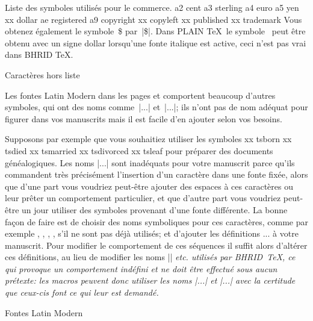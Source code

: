 \smallskip
Liste des symboles utilisés pour le commerce.
\beginchartable
a2 cent
a3 sterling
a4 euro
a5 yen
xx dollar
ae registered
a9 copyright
xx copyleft
xx published
xx trademark
\endchartable
Vous obtenez également le symbole~\$ par~|\$|. Dans PLAIN \TeX\ le
symbole \sterling\ peut être obtenu avec un signe dollar lorsqu'une
fonte italique est active, ceci n'est pas vrai dans BHRID \TeX.


\formalpar Caractères hors liste

Les fontes Latin Modern dans les pages  et  comportent
beaucoup d'autres symboles, qui ont des noms comme~|\tl...|
et~|\ts...|; ils n'ont pas de nom adéquat pour figurer dans vos
manuscrits mais il est facile d'en ajouter selon vos besoins.

Supposons par exemple que vous souhaitiez utiliser les symboles
\beginchartable
xx tsborn
xx tsdied
xx tsmarried
xx tsdivorced
xx tsleaf
\endchartable
pour préparer des documents généalogiques. Les noms |\ts...| sont
inadéquats pour votre manuscrit parce qu'ils commandent très
précisément l'insertion d'un caractère dans une fonte fixée, alors que
d'une part vous voudriez peut-être ajouter des espaces à ces
caractères ou leur prêter un comportement particulier, et que d'autre
part vous voudriez peut-être un jour utiliser des symboles provenant
d'une fonte différente. La bonne façon de faire est de choisir des
noms symboliques pour ces caractères, comme par exemple ,
, , ,  s'il ne sont pas
déjà utilisés; et d'ajouter les définitions
\begincode
\def\born{\tsborn}
\def\died{\tsdied}
...
\endcode
à votre manuscrit. Pour modifier le comportement de ces séquences il
suffit alors d'altérer ces définitions, au lieu de modifier les noms
|\tsborn| \em{etc.} utilisés par BHRID~\TeX, ce qui provoque un
comportement indéfini et ne doit être effectué sous aucun prétexte:
les macros peuvent donc utiliser les noms |\ts...| et |\tl...| avec la
certitude que ceux-cis font ce qui leur est demandé.


\formalpar  Fontes Latin Modern

\begincode
{}
\endcode

\bye

